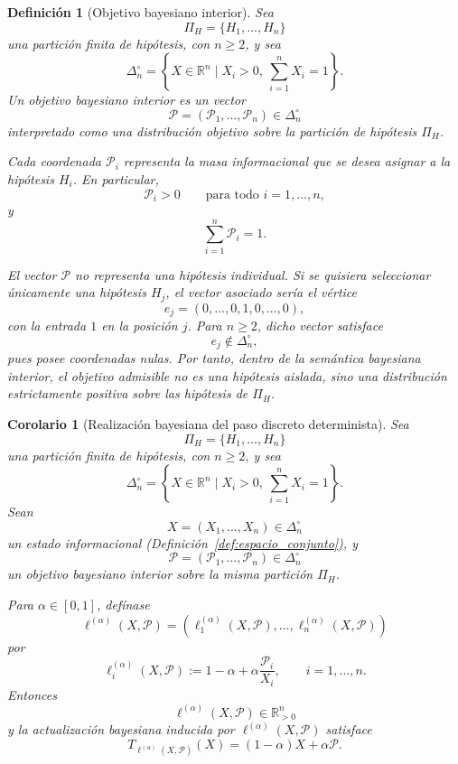 \documentclass[12pt]{article}
\newtheorem{definicion}{Definición}[section]
\newtheorem{corolario}{Corolario}[section]
\begin{document}
\begin{definicion}[Objetivo bayesiano interior]
Sea
\[
\Pi_H=\{H_1,\dots,H_n\}
\]
una partición finita de hipótesis, con \(n\geq 2\), y sea
\[
\Delta_n^\circ
=
\left\{
X\in\mathbb R^n
\mid
X_i>0,\ \sum_{i=1}^n X_i=1
\right\}.
\]
Un \emph{objetivo bayesiano interior} es un vector
\[
\mathcal P=(\mathcal P_1,\dots,\mathcal P_n)\in\Delta_n^\circ
\]
interpretado como una distribución objetivo sobre la partición de hipótesis \(\Pi_H\).

Cada coordenada \(\mathcal P_i\) representa la masa informacional que se desea asignar a la hipótesis \(H_i\). En particular,
\[
\mathcal P_i>0
\qquad\text{para todo }i=1,\dots,n,
\]
y
\[
\sum_{i=1}^n \mathcal P_i=1.
\]

El vector \(\mathcal P\) no representa una hipótesis individual. Si se quisiera seleccionar únicamente una hipótesis \(H_j\), el vector asociado sería el vértice
\[
e_j=(0,\dots,0,1,0,\dots,0),
\]
con la entrada \(1\) en la posición \(j\). Para \(n\geq 2\), dicho vector satisface
\[
e_j\notin\Delta_n^\circ,
\]
pues posee coordenadas nulas. Por tanto, dentro de la semántica bayesiana interior, el objetivo admisible no es una hipótesis aislada, sino una distribución estrictamente positiva sobre las hipótesis de \(\Pi_H\).
\end{definicion}

\begin{corolario}[Realización bayesiana del paso discreto determinista]
Sea
\[
\Pi_H=\{H_1,\dots,H_n\}
\]
una partición finita de hipótesis, con \(n\geq 2\), y sea
\[
\Delta_n^\circ
=
\left\{
X\in\mathbb R^n
\mid
X_i>0,\ \sum_{i=1}^n X_i=1
\right\}.
\]
Sean
\[
X=(X_1,\dots,X_n)\in\Delta_n^\circ
\]
un estado informacional (Definición~\ref{def:espacio_conjunto}), y
\[
\mathcal P=(\mathcal P_1,\dots,\mathcal P_n)\in\Delta_n^\circ
\]
un objetivo bayesiano interior sobre la misma partición \(\Pi_H\).

Para \(\alpha\in[0,1]\), defínase
\[
\ell^{(\alpha)}(X,\mathcal P)
=
\left(
\ell^{(\alpha)}_1(X,\mathcal P),
\dots,
\ell^{(\alpha)}_n(X,\mathcal P)
\right)
\]
por
\[
\ell^{(\alpha)}_i(X,\mathcal P)
:=
1-\alpha+\alpha\frac{\mathcal P_i}{X_i},
\qquad i=1,\dots,n.
\]
Entonces
\[
\ell^{(\alpha)}(X,\mathcal P)\in\mathbb R_{>0}^n
\]
y la actualización bayesiana inducida por \(\ell^{(\alpha)}(X,\mathcal P)\) satisface
\[
T_{\ell^{(\alpha)}(X,\mathcal P)}(X)
=
(1-\alpha)X+\alpha \mathcal P.
\]
\end{corolario}
\end{document}
